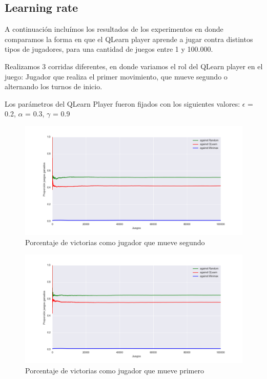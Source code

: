\subsection{Learning rate}

A continuación incluímos los resultados de los experimentos en donde comparamos la forma en que el
QLearn player aprende a jugar contra distintos tipos de jugadores, para una cantidad de juegos entre
1 y 100.000.

Realizamos 3 corridas diferentes, en donde variamos el rol del QLearn player en el juego: Jugador
que realiza el primer movimiento, que mueve segundo o alternando los turnos de inicio.

Los parámetros del QLearn Player fueron fijados con los siguientes valores:
$\epsilon$ = 0.2, $\alpha$ = 0.3, $\gamma$ = 0.9

\begin{figure}
	\centerline{\includegraphics[width=1.3\textwidth]{figures/learning_rate_as_second_player.png}}
	\caption{Porcentaje de victorias como jugador que mueve segundo}
\end{figure}

\begin{figure}
	\centerline{\includegraphics[width=1.3\textwidth]{figures/learning_rate_as_first_player.png}}
	\caption{Porcentaje de victorias como jugador que mueve primero}
\end{figure}

